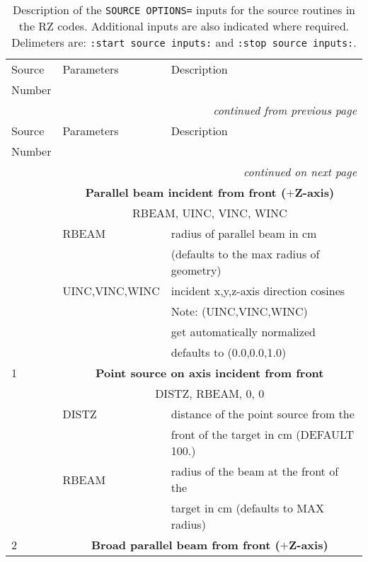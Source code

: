 \begin{longtable}{lll}
\caption[Description of source options for the RZ codes]
{Description of the {\tt SOURCE OPTIONS=} inputs for the source
routines in the RZ codes.  Additional inputs are also indicated
where required.  Delimeters are: {\tt :start source inputs:}
and {\tt :stop source inputs:}.}\\
\hline\hline
Source & Parameters & Description \\
Number &&\\
\hline
\endfirsthead
\hline
\multicolumn{3}{r}{\small\slshape continued from previous page} \\
\hline \hline
Source & Parameters      & Description \\
Number &&\\
\hline
\endhead
\hline
\multicolumn{3}{r}{\small\slshape continued on next page} \\ \hline
\endfoot
\hline \hline
\endlastfoot
0 & \multicolumn{2}{c}{\bf Parallel beam incident from front ($+$Z-axis)}\\
  & \multicolumn{2}{c}{      RBEAM, UINC, VINC, WINC}\\
  & RBEAM   & radius of parallel beam in cm       \\
  &         & (defaults to the max radius of geometry)\\
  & UINC,VINC,WINC    & incident x,y,z-axis direction cosines \\
  &                & Note: (UINC,VINC,WINC) \\
  &                & get automatically normalized \\
  &                 &  defaults to (0.0,0.0,1.0) \\
\hline
1 & \multicolumn{2}{c}{\bf Point source on axis incident from front}\\
  & \multicolumn{2}{c}{      DISTZ, RBEAM, 0, 0}\\
  & DISTZ   & distance of the point source from the\\
  &                & front of the target in cm (DEFAULT 100.)\\
  & RBEAM   & radius of the beam at the front of the\\
  &                & target in cm (defaults to MAX radius) \\
\hline
2 & \multicolumn{2}{c}{\bf Broad parallel beam from front ($+$Z-axis)} \\

\end{longtable}
